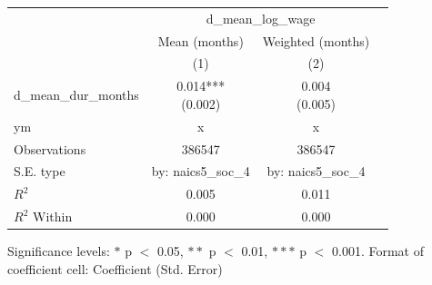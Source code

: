 \renewcommand\cellalign{t}
\begin{threeparttable}
\begin{tabular}{lccc}
\toprule
 & \multicolumn{2}{c}{d_mean_log_wage} \\
\cmidrule(lr){2-3} 
 & Mean (months) & Weighted (months) \\
 & (1) & (2) \\
\midrule
\addlinespace
d_mean_dur_months & \makecell{0.014*** \\ (0.002)} & \makecell{0.004 \\ (0.005)} \\
\midrule
\addlinespace
ym & x & x \\
\midrule
\addlinespace
Observations & 386547 & 386547 \\
S.E. type & by: naics5_soc_4 & by: naics5_soc_4 \\
$R^2$ & 0.005 & 0.011 \\
$R^2$ Within & 0.000 & 0.000 \\
\bottomrule
\end{tabular}
\footnotesize Significance levels: $*$ p $<$ 0.05, $**$ p $<$ 0.01, $***$ p $<$ 0.001. Format of coefficient cell: Coefficient 
 (Std. Error)
\end{threeparttable}